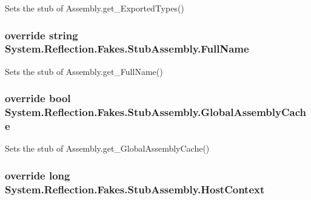 Sets the stub of Assembly.\-get\-\_\-\-Exported\-Types()

\hypertarget{class_system_1_1_reflection_1_1_fakes_1_1_stub_assembly_abbda4074099f00338cbf23d33d7e6a12}{
\subsubsection[{Full\-Name}]{\setlength{\rightskip}{0pt plus 5cm}override string System.\-Reflection.\-Fakes.\-Stub\-Assembly.\-Full\-Name\hspace{0.3cm}{\ttfamily [get]}}}\label{class_system_1_1_reflection_1_1_fakes_1_1_stub_assembly_abbda4074099f00338cbf23d33d7e6a12}


Sets the stub of Assembly.\-get\-\_\-\-Full\-Name()

\hypertarget{class_system_1_1_reflection_1_1_fakes_1_1_stub_assembly_a3fe7699e6644bd13c0599bdb090c236a}{
\subsubsection[{Global\-Assembly\-Cache}]{\setlength{\rightskip}{0pt plus 5cm}override bool System.\-Reflection.\-Fakes.\-Stub\-Assembly.\-Global\-Assembly\-Cache\hspace{0.3cm}{\ttfamily [get]}}}\label{class_system_1_1_reflection_1_1_fakes_1_1_stub_assembly_a3fe7699e6644bd13c0599bdb090c236a}


Sets the stub of Assembly.\-get\-\_\-\-Global\-Assembly\-Cache()

\hypertarget{class_system_1_1_reflection_1_1_fakes_1_1_stub_assembly_a6dfb958fa845305cd2401e04f09b0a6a}{
\subsubsection[{Host\-Context}]{\setlength{\rightskip}{0pt plus 5cm}override long System.\-Reflection.\-Fakes.\-Stub\-Assembly.\-Host\-Context\hspace{0.3cm}{\ttfamily [get]}}}\label{class_system_1_1_reflection_1_1_fakes_1_1_stub_assembly_a6dfb958fa845305cd2401e04f09b0a6a}


